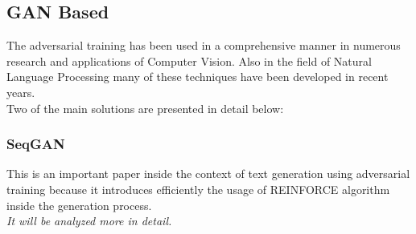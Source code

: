 \subsection{GAN Based}
The adversarial training has been used in a comprehensive manner in numerous research and applications of Computer Vision. Also in the field of Natural Language Processing many of these techniques have been developed in recent years. \\
Two of the main solutions are presented in detail below:
\subsubsection[SeqGAN]{SeqGAN \cite{Yu2016}}
\label{sect:SeqGAN}
This is an important paper inside the context of text generation using adversarial training because it introduces efficiently the usage of REINFORCE algorithm inside the generation process. \\
\textit{It will be analyzed more in detail.}

